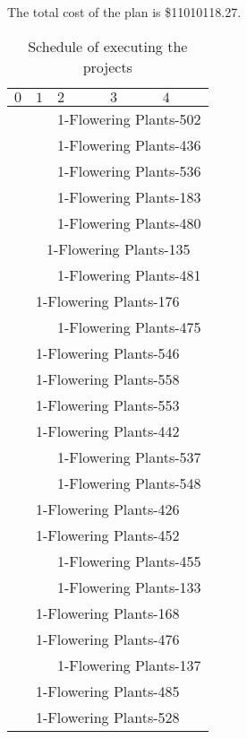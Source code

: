 \documentclass{article}
\begin{document}
The total cost of the plan is \$11010118.27.

\begin{table}[h!]
\centering
\caption{Schedule of executing the projects}
\label{tab:schedule}
\begin{tabular}{|p{1.8cm}|p{1.8cm}|p{1.8cm}|p{1.8cm}|p{1.8cm}|}
\hline
$0$ & $1$ & $2$ & $3$ & $4$\\
\hline\hline
& & \multicolumn{3}{c|}{1-Flowering Plants-502}\\\hline
& & \multicolumn{3}{c|}{1-Flowering Plants-436}\\\hline
& & \multicolumn{3}{c|}{1-Flowering Plants-536}\\\hline
& & \multicolumn{3}{c|}{1-Flowering Plants-183}\\\hline
& & \multicolumn{3}{c|}{1-Flowering Plants-480}\\\hline
& \multicolumn{4}{c|}{1-Flowering Plants-135}\\\hline
& & \multicolumn{3}{c|}{1-Flowering Plants-481}\\\hline
\multicolumn{5}{|c|}{1-Flowering Plants-176}\\\hline
& & \multicolumn{3}{c|}{1-Flowering Plants-475}\\\hline
\multicolumn{5}{|c|}{1-Flowering Plants-546}\\\hline
\multicolumn{5}{|c|}{1-Flowering Plants-558}\\\hline
\multicolumn{5}{|c|}{1-Flowering Plants-553}\\\hline
\multicolumn{5}{|c|}{1-Flowering Plants-442}\\\hline
& & \multicolumn{3}{c|}{1-Flowering Plants-537}\\\hline
& & \multicolumn{3}{c|}{1-Flowering Plants-548}\\\hline
\multicolumn{5}{|c|}{1-Flowering Plants-426}\\\hline
\multicolumn{5}{|c|}{1-Flowering Plants-452}\\\hline
& & \multicolumn{3}{c|}{1-Flowering Plants-455}\\\hline
& & \multicolumn{3}{c|}{1-Flowering Plants-133}\\\hline
\multicolumn{5}{|c|}{1-Flowering Plants-168}\\\hline
\multicolumn{5}{|c|}{1-Flowering Plants-476}\\\hline
& & \multicolumn{3}{c|}{1-Flowering Plants-137}\\\hline
\multicolumn{5}{|c|}{1-Flowering Plants-485}\\\hline
\multicolumn{5}{|c|}{1-Flowering Plants-528}\\\hline

\end{tabular}
\end{table}
\end{document}
